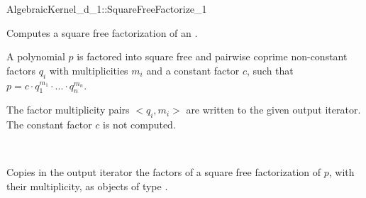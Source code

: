 \begin{ccRefFunctionObjectConcept}{AlgebraicKernel_d_1::SquareFreeFactorize_1}

\ccDefinition
Computes a square free factorization of an
.

A polynomial $p$ is factored into square free and pairwise 
coprime non-constant factors $q_i$ with multiplicities $m_i$ 
and a constant factor $c$, such that 
$p = c  \cdot  q_1^{m_1}  \cdot  ...  \cdot  q_n^{m_n}$.

The factor multiplicity pairs $<q_i,m_i>$ are written to the 
given output iterator. The constant factor $c$ is not computed. 

\ccRefines 
{}\\

\ccOperations
{}

{Copies in the output iterator the factors of a square free 
factorization of $p$, with their multiplicity, as objects of type 
.}

\ccSeeAlso
{}\\
\\

\end{ccRefFunctionObjectConcept}
